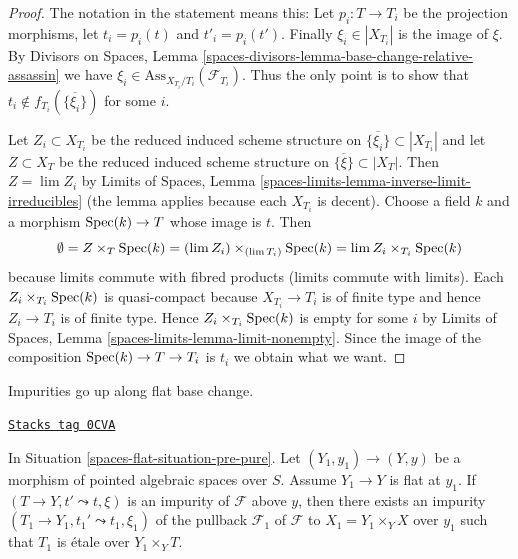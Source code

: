 \begin{proof}
The notation in the statement means this: Let $p_i : T \to T_i$
be the projection morphisms, let $t_i = p_i(t)$ and $t'_i = p_i(t')$.
Finally $\xi_i \in |X_{T_i}|$ is the image of $\xi$. By
Divisors on Spaces, Lemma
\ref{spaces-divisors-lemma-base-change-relative-assassin}
we have $\xi_i \in \text{Ass}_{X_{T_i}/T_i}(\mathcal{F}_{T_i})$.
Thus the only point is to show that
$t_i \not \in f_{T_i}(\overline{\{\xi_i\}})$ for some $i$.

\medskip\noindent
Let $Z_i \subset X_{T_i}$ be the reduced induced scheme structure
on $\overline{\{\xi_i\}} \subset |X_{T_i}|$
and let $Z \subset X_T$ be the reduced induced scheme structure on
$\overline{\{\xi\}} \subset |X_T|$.
Then $Z = \lim Z_i$ by
Limits of Spaces, Lemma \ref{spaces-limits-lemma-inverse-limit-irreducibles}
(the lemma applies because each $X_{T_i}$ is decent).
Choose a field $k$ and a morphism $\operatorname{Spec}(k) \to T$ whose image is $t$.
Then
$$
\emptyset =
Z \times_T \operatorname{Spec}(k) = (\lim Z_i) \times_{(\lim T_i)} \operatorname{Spec}(k)
= \lim Z_i \times_{T_i} \operatorname{Spec}(k)
$$
because limits commute with fibred products (limits commute with limits).
Each $Z_i \times_{T_i} \operatorname{Spec}(k)$ is quasi-compact because $X_{T_i} \to T_i$
is of finite type and hence $Z_i \to T_i$ is of finite type.
Hence $Z_i \times_{T_i} \operatorname{Spec}(k)$ is empty for some $i$ by
Limits of Spaces, Lemma \ref{spaces-limits-lemma-limit-nonempty}.
Since the image of the composition $\operatorname{Spec}(k) \to T \to T_i$ is $t_i$
we obtain what we want.
\end{proof}

Impurities go up along flat base change.

\begin{lemma}
\label{spaces-flat-lemma-flat-ascent-impurity}
\href{https://stacks.math.columbia.edu/tag/0CVA}{\texttt{Stacks tag 0CVA}}

In Situation \ref{spaces-flat-situation-pre-pure}.
Let $(Y_1, y_1) \to (Y, y)$ be a morphism of pointed
algebraic spaces over $S$. Assume $Y_1 \to Y$ is flat at $y_1$.
If $(T \to Y, t' \leadsto t, \xi)$ is an impurity of
$\mathcal{F}$ above $y$, then there exists an impurity
$(T_1 \to Y_1, t_1' \leadsto t_1, \xi_1)$ of the pullback
$\mathcal{F}_1$ of $\mathcal{F}$ to $X_1 = Y_1 \times_Y X$
over $y_1$ such that $T_1$ is \'etale over $Y_1 \times_Y T$.
\end{lemma}

